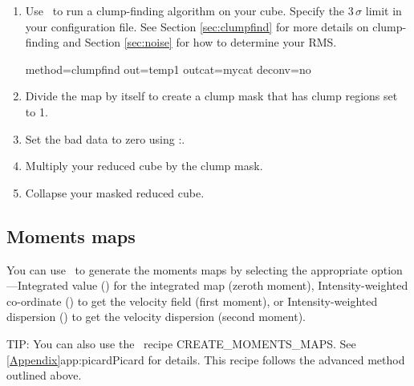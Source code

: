 \documentclass[11pt,oneside,chapters]{starlink}
\providecommand{\nomagic}{\xref{\task{nomagic}}{sun95}{NOMAGIC}}
\begin{document}
\begin{enumerate}[label=(\arabic*)]
\item Use \findclumps\ to run a clump-finding algorithm on your cube.
Specify the 3\,$\sigma$ limit in your configuration file. See Section
\ref{sec:clumpfind} for more details on clump-finding and Section
\ref{sec:noise} for how to determine your RMS.
\begin{terminalv}
  method=clumpfind out=temp1 outcat=mycat deconv=no
\end{terminalv}

\item Divide the map by itself to create a clump mask that has clump
regions set to 1.
\begin{terminalv}
\end{terminalv}

\item Set the bad data to zero using \Kappa:\nomagic.
\begin{terminalv}
\end{terminalv}

\item Multiply your reduced cube by the clump mask.
\begin{terminalv}
\end{terminalv}

\item Collapse your masked reduced cube.
\begin{terminalv}
\end{terminalv}
\end{enumerate}

\subsection{Moments maps}

You can use \collapse\ to generate the moments maps by selecting the
appropriate  option---Integrated value
() for the integrated map (zeroth moment),
Intensity-weighted co-ordinate () to get the velocity field
(first moment), or Intensity-weighted dispersion () to get the
velocity dispersion (second moment).

\begin{tip}
TIP: You can also use the \picard\ recipe CREATE\_MOMENTS\_MAPS. See
\cref{Appendix}{app:picard}{Picard} for details. This recipe follows
the advanced method outlined above.
\end{tip}
\end{document}
